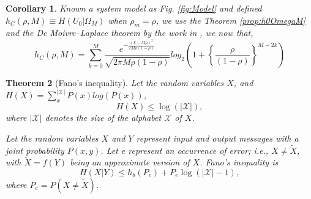 \documentclass[a4paper,10pt]{article}
\newtheorem{mytheorem}{Theorem}
\newtheorem{corollary}[mytheorem]{Corollary}
\begin{document}
\begin{mdframed}[style=MDFStyGrayScreen]
\begin{corollary}
 \label{coro:h0OmegaM}
 Known a system model as Fig. \ref{fig:Model} and defined $h_{C}(\rho,M)\equiv H(U_0|\Omega_M)$ 
 when $\rho_m=\rho$, we use the Theorem \ref{prop:h0OmegaM} and the De Moivre–Laplace theorem
 by the work in \cite[p.~37]{shu0omega}, we now that,
\begin{equation}\label{eq:h0OmegaMC}
h_{C}(\rho,M)  = \sum_{k=0}^M \frac{e^{-\frac{(k-M\rho)^2}{2M\rho(1-\rho)}}}{\sqrt{2\pi M \rho (1-\rho)}}  log_2\left ( 1 + \left\{\frac{\rho}{(1-\rho)}\right\}^{M-2k} \right )    
\end{equation}
\end{corollary}
\end{mdframed}

\begin{mdframed}[style=MDFStyGrayScreen]
\begin{mytheorem}[Fano's inequality]
 \label{teo:FanoInequality}
Let the random variables $X$, and $ H(X)=\sum_{x}^{|{\mathcal {X}}|} P(x)log(P(x))$,
\begin{equation}\label{eq:FanoInequality1}
 H(X)\leq \log(|{\mathcal {X}}|), 
\end{equation}
where $|\mathcal {X}|$ denotes the size of the alphabet ${\mathcal {X}}$ of $X$.


 
Let the random variables $X$ and $Y$ represent input and output messages with a 
joint probability $P(x,y)$. 
Let e represent an occurrence of error; i.e.,  $X \neq {\tilde {X}}$, 
with $\tilde {X}=f(Y)$ being an approximate version of $X$. Fano's inequality is
\begin{equation}\label{eq:FanoInequality2}
 H(X|Y)\leq h_{b}(P_e)+P_e\log(|{\mathcal {X}}|-1), 
\end{equation}
where $P_e=P(X \neq {\tilde {X}})$.
\end{mytheorem}
\end{mdframed}

\end{document}
